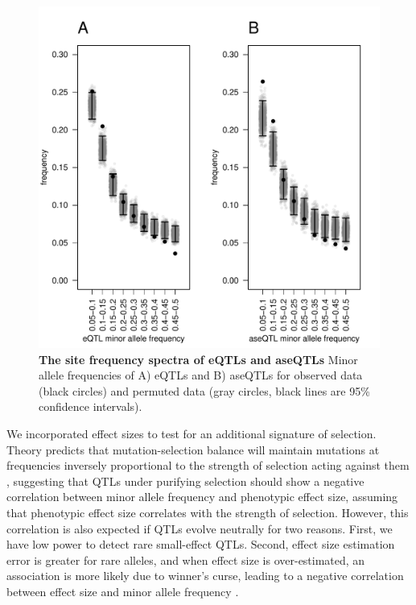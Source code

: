 \begin{figure}[ht!]
      \centering
       \includegraphics[width=\linewidth]{Ch3Fig3}
    \caption{\textbf{The site frequency spectra of eQTLs and aseQTLs} Minor allele frequencies of A) eQTLs and B) aseQTLs for observed data (black circles) and permuted data (gray circles, black lines are 95\% confidence intervals).}
    \label{fig:3fig3}
\end{figure}

We incorporated effect sizes to test for an additional signature of selection. Theory predicts that mutation-selection balance will maintain mutations at frequencies inversely proportional to the strength of selection acting against them \citep{Haldane1927-pj}, suggesting that QTLs under purifying selection should show a negative correlation between minor allele frequency and phenotypic effect size, assuming that phenotypic effect size correlates with the strength of selection. However, this correlation is also expected if QTLs evolve neutrally for two reasons. First, we have low power to detect rare small-effect QTLs. Second, effect size estimation error is greater for rare alleles, and when effect size is over-estimated, an association is more likely due to winner’s curse, leading to a negative correlation between effect size and minor allele frequency \citep{Capen1971-bs}. 

